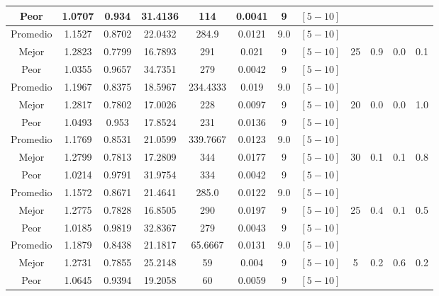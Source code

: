 \begin{table}[h!]
\begin{center}
\begin{tabular}{|c|c|c|c|c|c|c|c|c|c|c|c|}
            \cline{1-8}
            Peor & 1.0707 & 0.934  & 31.4136 & 114 & 0.0041 & 9 & $[5-10]$ &  &  &  & \\
        \hline
        \hline
            Promedio  & 1.1527 & 0.8702 & 22.0432 & 284.9 & 0.0121 & 9.0 & $[5-10]$ &  &  &  & \\
            \cline{1-8}
            Mejor & 1.2823 & 0.7799  & 16.7893 & 291 & 0.021 & 9 & $[5-10]$ & 25 & 0.9 & 0.0 & 0.1\\
            \cline{1-8}
            Peor & 1.0355 & 0.9657  & 34.7351 & 279 & 0.0042 & 9 & $[5-10]$ &  &  &  & \\
        \hline
        \hline
            Promedio  & 1.1967 & 0.8375 & 18.5967 & 234.4333 & 0.019 & 9.0 & $[5-10]$ &  &  &  & \\
            \cline{1-8}
            Mejor & 1.2817 & 0.7802  & 17.0026 & 228 & 0.0097 & 9 & $[5-10]$ & 20 & 0.0 & 0.0 & 1.0\\
            \cline{1-8}
            Peor & 1.0493 & 0.953  & 17.8524 & 231 & 0.0136 & 9 & $[5-10]$ &  &  &  & \\
        \hline
        \hline
            Promedio  & 1.1769 & 0.8531 & 21.0599 & 339.7667 & 0.0123 & 9.0 & $[5-10]$ &  &  &  & \\
            \cline{1-8}
            Mejor & 1.2799 & 0.7813  & 17.2809 & 344 & 0.0177 & 9 & $[5-10]$ & 30 & 0.1 & 0.1 & 0.8\\
            \cline{1-8}
            Peor & 1.0214 & 0.9791  & 31.9754 & 334 & 0.0042 & 9 & $[5-10]$ &  &  &  & \\
        \hline
        \hline
            Promedio  & 1.1572 & 0.8671 & 21.4641 & 285.0 & 0.0122 & 9.0 & $[5-10]$ &  &  &  & \\
            \cline{1-8}
            Mejor & 1.2775 & 0.7828  & 16.8505 & 290 & 0.0197 & 9 & $[5-10]$ & 25 & 0.4 & 0.1 & 0.5\\
            \cline{1-8}
            Peor & 1.0185 & 0.9819  & 32.8367 & 279 & 0.0043 & 9 & $[5-10]$ &  &  &  & \\
        \hline
        \hline
            Promedio  & 1.1879 & 0.8438 & 21.1817 & 65.6667 & 0.0131 & 9.0 & $[5-10]$ &  &  &  & \\
            \cline{1-8}
            Mejor & 1.2731 & 0.7855  & 25.2148 & 59 & 0.004 & 9 & $[5-10]$ & 5 & 0.2 & 0.6 & 0.2\\
            \cline{1-8}
            Peor & 1.0645 & 0.9394  & 19.2058 & 60 & 0.0059 & 9 & $[5-10]$ &  &  &  & \\
        \hline

\end{tabular}
\end{center}
\end{table}
